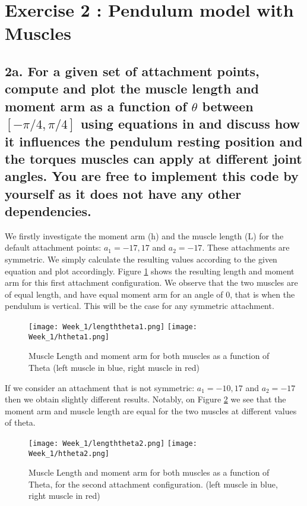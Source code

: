 \documentclass[11pt]{article}
\begin{document}
\section*{Exercise 2 : Pendulum model with Muscles}
\label{sec:question-1}

\label{sec:questions}
\subsection*{2a. For a given set of attachment points, compute and
  plot the muscle length and moment arm as a function of $\theta$
  between $[-\pi/4, \pi/4]$ using equations in 
  and discuss how it influences the pendulum resting position and the
  torques muscles can apply at different joint angles. You are free to implement
this code by yourself as it does not have any other dependencies.}
\label{sec:2a}

We firstly investigate the moment arm (h) and the muscle length (L) for the default attachment points: \(a_1=-17,17\) and \(a_2=-17\). These attachments are symmetric. We simply calculate the resulting values according to the given equation and plot accordingly. Figure \ref{fig:att1} shows the resulting length and moment arm for this first attachment configuration. We observe that the two muscles are of equal length, and have equal moment arm for an angle of 0, that is when the pendulum is vertical. This will be the case for any symmetric attachment. 

\begin{figure}[!h]

\centering
{}
\texttt{[image: Week\_1/lengththeta1.png]}
\endminipage\hfill
{}
\vspace{0.5cm}
\texttt{[image: Week\_1/htheta1.png]}


\endminipage

\caption{Muscle Length and moment arm for both muscles as a function of Theta (left muscle in blue, right muscle in red)}
\label{fig:att1}
\end{figure}


If we consider an attachment that is not symmetric: \(a_1=-10,17\) and \(a_2=-17\) then we obtain slightly different results. Notably, on Figure \ref{fig:att2} we see that the moment arm and muscle length are equal for the two muscles at different values of theta. 

\begin{figure}[!h]

\centering
{}
\texttt{[image: Week\_1/lengththeta2.png]}
\endminipage\hfill
{}
\vspace{0.5cm}
\texttt{[image: Week\_1/htheta2.png]} 
\endminipage
\caption{Muscle Length and moment arm for both muscles as a function of Theta, for the second attachment configuration. (left muscle in blue, right muscle in red)}
\label{fig:att2}
\end{figure}
\end{document}
